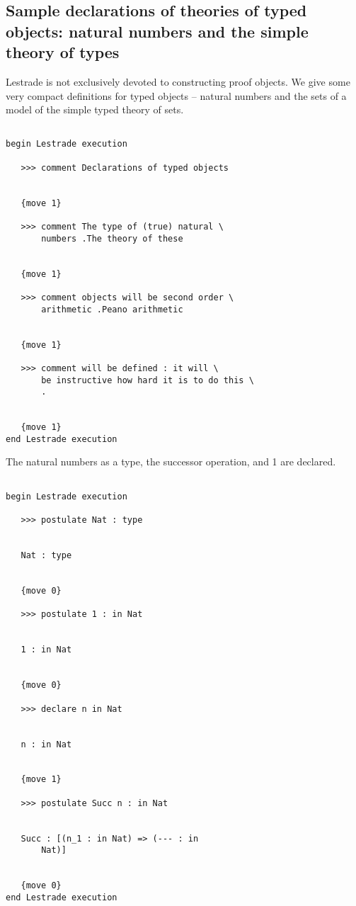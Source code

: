 \documentclass[12pt]{article}
\begin{document}
\subsection{Sample declarations of theories of typed objects:  natural numbers and the simple theory of types}

Lestrade is not exclusively devoted to constructing proof objects.  We give some very compact definitions for typed objects -- natural numbers and the sets of a model of the simple typed theory of sets.

\begin{verbatim}

begin Lestrade execution

   >>> comment Declarations of typed objects


   {move 1}

   >>> comment The type of (true) natural \
       numbers .The theory of these


   {move 1}

   >>> comment objects will be second order \
       arithmetic .Peano arithmetic


   {move 1}

   >>> comment will be defined : it will \
       be instructive how hard it is to do this \
       .


   {move 1}
end Lestrade execution
\end{verbatim}

The natural numbers as a type, the successor operation, and 1 are declared.

\begin{verbatim}

begin Lestrade execution

   >>> postulate Nat : type


   Nat : type


   {move 0}

   >>> postulate 1 : in Nat


   1 : in Nat


   {move 0}

   >>> declare n in Nat


   n : in Nat


   {move 1}

   >>> postulate Succ n : in Nat


   Succ : [(n_1 : in Nat) => (--- : in 
       Nat)]


   {move 0}
end Lestrade execution
\end{verbatim}
\end{document}
